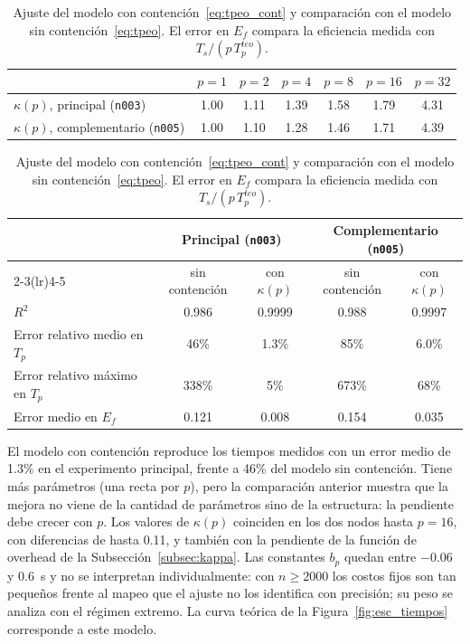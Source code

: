 \documentclass[11pt, a4paper]{article}
\begin{document}
\begin{table}[H]
\centering
\small
\caption{Ajuste del modelo con contención~\eqref{eq:tpeo_cont} y comparación con el modelo sin contención~\eqref{eq:tpeo}. El error en $E_f$ compara la eficiencia medida con $T_s/(p\,T_p^{teo})$.}
\label{tab:ajuste_kappa}
\begin{tabular}{lcccccc}
\toprule
& $p=1$ & $p=2$ & $p=4$ & $p=8$ & $p=16$ & $p=32$ \\
\midrule
$\kappa(p)$, principal (\texttt{n003})      & 1.00 & 1.11 & 1.39 & 1.58 & 1.79 & 4.31 \\
$\kappa(p)$, complementario (\texttt{n005}) & 1.00 & 1.10 & 1.28 & 1.46 & 1.71 & 4.39 \\
\bottomrule
\end{tabular}

\vspace{0.6em}
\begin{tabular}{lcccc}
\toprule
& \multicolumn{2}{c}{Principal (\texttt{n003})} & \multicolumn{2}{c}{Complementario (\texttt{n005})} \\
\cmidrule(lr){2-3}\cmidrule(lr){4-5}
& sin contención & con $\kappa(p)$ & sin contención & con $\kappa(p)$ \\
\midrule
$R^2$                          & 0.986 & 0.9999 & 0.988 & 0.9997 \\
Error relativo medio en $T_p$  & 46\%  & 1.3\%  & 85\%  & 6.0\%  \\
Error relativo máximo en $T_p$ & 338\% & 5\%    & 673\% & 68\%   \\
Error medio en $E_f$           & 0.121 & 0.008  & 0.154 & 0.035  \\
\bottomrule
\end{tabular}
\end{table}

El modelo con contención reproduce los tiempos medidos con un error medio de 1.3\% en el experimento principal, frente a 46\% del modelo sin contención. Tiene más parámetros (una recta por $p$), pero la comparación anterior muestra que la mejora no viene de la cantidad de parámetros sino de la estructura: la pendiente debe crecer con $p$. Los valores de $\kappa(p)$ coinciden en los dos nodos hasta $p = 16$, con diferencias de hasta 0.11, y también con la pendiente de la función de overhead de la Subsección~\ref{subsec:kappa}. Las constantes $b_p$ quedan entre $-0.06$ y $0.6$~s y no se interpretan individualmente: con $n \ge 2000$ los costos fijos son tan pequeños frente al mapeo que el ajuste no los identifica con precisión; su peso se analiza con el régimen extremo. La curva teórica de la Figura~\ref{fig:esc_tiempos} corresponde a este modelo.
\end{document}
